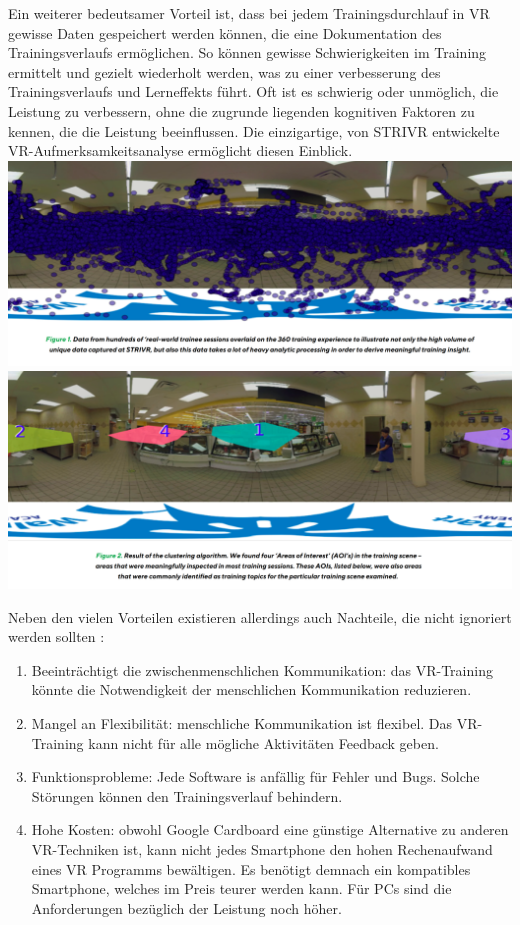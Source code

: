 Ein weiterer bedeutsamer Vorteil ist, dass bei jedem Trainingsdurchlauf in VR gewisse Daten gespeichert werden können, die eine Dokumentation des Trainingsverlaufs ermöglichen. So können gewisse Schwierigkeiten im Training ermittelt und gezielt wiederholt werden, was zu einer verbesserung des Trainingsverlaufs und Lerneffekts führt. \glqq Oft ist es schwierig oder unmöglich, die Leistung zu verbessern, ohne die zugrunde liegenden kognitiven Faktoren zu kennen, die die Leistung beeinflussen. Die einzigartige, von STRIVR entwickelte VR-Aufmerksamkeitsanalyse ermöglicht diesen Einblick.\grqq\ \citep{18}
\includegraphics[width=\textwidth]{images/intentionanalys1.png}
\includegraphics[width=\textwidth]{images/intentionanalys2.png}

Neben den vielen Vorteilen existieren allerdings auch Nachteile, die nicht ignoriert werden sollten \citep{17}:

\begin{enumerate}
\item Beeinträchtigt die zwischenmenschlichen Kommunikation: das VR-Training könnte die Notwendigkeit der menschlichen Kommunikation reduzieren.
\item Mangel an Flexibilität: menschliche Kommunikation ist flexibel. Das VR-Training kann nicht für alle mögliche Aktivitäten Feedback geben.
\item Funktionsprobleme: Jede Software is anfällig für Fehler und Bugs. Solche Störungen können den Trainingsverlauf behindern.
\item Hohe Kosten: obwohl Google Cardboard eine günstige Alternative zu anderen VR-Techniken ist, kann nicht jedes Smartphone den hohen Rechenaufwand eines VR Programms bewältigen. Es benötigt demnach ein kompatibles Smartphone, welches im Preis teurer werden kann. Für PCs sind die Anforderungen bezüglich der Leistung noch höher.
\end{enumerate}\

